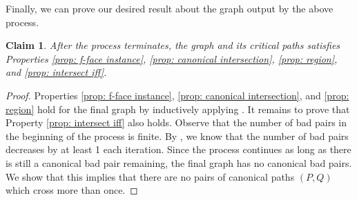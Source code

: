 \documentclass[11pt]{article}
\newtheorem{claim}[theorem]{Claim}
\begin{document}

Finally, we can prove our desired result about the graph output by the above process.

\begin{claim}
    After the process terminates, the graph and its critical paths satisfies Properties \ref{prop: f-face instance}, \ref{prop: canonical intersection}, \ref{prop: region}, and \ref{prop: intersect iff}.
\end{claim}
\begin{proof}
    Properties \ref{prop: f-face instance}, \ref{prop: canonical intersection}, and \ref{prop: region} hold for the final graph by inductively applying . It remains to prove that Property \ref{prop: intersect iff} also holds. Observe that the number of bad pairs in the beginning of the process is finite. By , we know that the number of bad pairs decreases by at least 1 each iteration. Since the process continues as long as there is still a canonical bad pair remaining, the final graph has no canonical bad pairs. We show that this implies that there are no pairs of canonical paths $(P,Q)$ which cross more than once. 

    
    

\end{proof}
\end{document}
